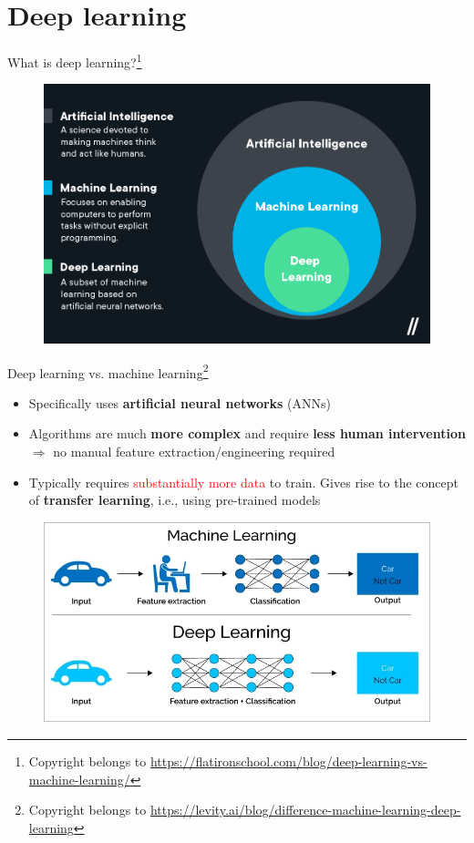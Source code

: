 \documentclass{beamer}
\begin{document}
\section{Deep learning}
\begin{frame}{What is deep learning?\footnote{Copyright belongs to \url{https://flatironschool.com/blog/deep-learning-vs-machine-learning/}}}
\begin{figure}
\includegraphics[width=0.75\linewidth]{Images/AI.png}
\end{figure}
\end{frame}
\begin{frame}{Deep learning vs. machine learning\footnote{Copyright belongs to \url{https://levity.ai/blog/difference-machine-learning-deep-learning}}}
\begin{itemize}
\item Specifically uses \textbf{artificial neural networks} (ANNs)
\item Algorithms are much \textbf{more complex} and require \textbf{less human intervention} $\Rightarrow$ no manual feature extraction/engineering required
\item Typically requires \textcolor{red}{substantially more data} to train. Gives rise to the concept of \textbf{transfer learning}, i.e., using pre-trained models 
\end{itemize}
\begin{figure}
\includegraphics[width=0.5\linewidth]{Images/ML.jpeg}
\end{figure}
\end{frame}
\end{document}
